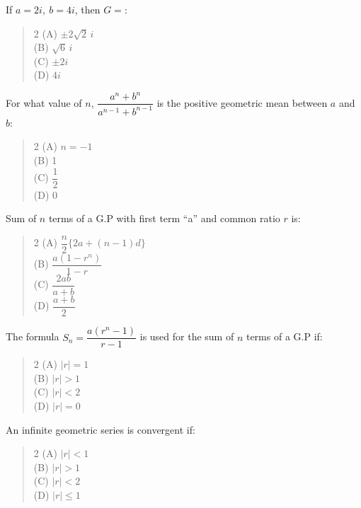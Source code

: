 \documentclass[11pt,a4paper]{article}
\begin{document}
\begin{mcqlist}
\item If $a=2i,\ b=4i$, then $G=$:
\begin{quote}\begin{multicols}{2}
\noindent (A) $\pm2\sqrt{2}\,i$ \\
(B) $\sqrt{6}\,i$ \\
(C) $\pm2i$ \\
(D) $4i$
\end{multicols}\end{quote}

\item For what value of $n$, $\dfrac{a^n+b^n}{a^{n-1}+b^{n-1}}$ is the positive geometric mean between $a$ and $b$:
\begin{quote}\begin{multicols}{2}
\noindent (A) $n=-1$ \\
(B) 1 \\
(C) $\dfrac{1}{2}$ \\
(D) 0
\end{multicols}\end{quote}

\item Sum of $n$ terms of a G.P with first term ``a'' and common ratio $r$ is:
\begin{quote}\begin{multicols}{2}
\noindent (A) $\dfrac{n}{2}\{2a+(n-1)d\}$ \\
(B) $\dfrac{a(1-r^n)}{1-r}$ \\
(C) $\dfrac{2ab}{a+b}$ \\
(D) $\dfrac{a+b}{2}$
\end{multicols}\end{quote}

\item The formula $S_n=\dfrac{a(r^n-1)}{r-1}$ is used for the sum of $n$ terms of a G.P if:
\begin{quote}\begin{multicols}{2}
\noindent (A) $|r|=1$ \\
(B) $|r|>1$ \\
(C) $|r|<2$ \\
(D) $|r|=0$
\end{multicols}\end{quote}

\item An infinite geometric series is convergent if:
\begin{quote}\begin{multicols}{2}
\noindent (A) $|r|<1$ \\
(B) $|r|>1$ \\
(C) $|r|<2$ \\
(D) $|r|\leq1$
\end{multicols}\end{quote}


\end{mcqlist}
\end{document}

